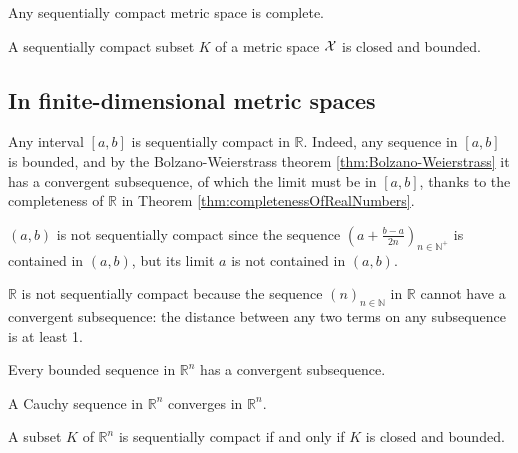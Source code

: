 \begin{coro}
  \label{coro:compactnessImpliesCompleteness}
  Any sequentially compact metric space is complete.
\end{coro}

\begin{lem}
  \label{lem:compactSetsIsClosedAndBounded}
  A sequentially compact subset $K$ of a metric space ${\cal X}$
  is closed and bounded.
\end{lem}




\subsection{In finite-dimensional metric spaces}

\begin{exm}
  Any interval $[a,b]$ is sequentially compact in $\mathbb{R}$.
  Indeed, any sequence in $[a,b]$
  is bounded, and by the Bolzano-Weierstrass theorem
  \ref{thm:Bolzano-Weierstrass}
  it has a convergent subsequence,
  of which the limit must be in $[a,b]$, 
  thanks to the completeness of $\mathbb{R}$
  in Theorem \ref{thm:completenessOfRealNumbers}.
\end{exm}

\begin{exm}
  $(a,b)$ is not sequentially compact
  since the sequence
  $\left(a+\frac{b-a}{2n}\right)_{n\in \mathbb{N}^+}$
  is contained in $(a,b)$,
  but its limit $a$ is not contained in $(a,b)$.
\end{exm}

\begin{exm}
  $\mathbb{R}$ is not sequentially compact
  because the sequence $(n)_{n\in\mathbb{N}}$ in $\mathbb{R}$
  cannot have a convergent subsequence: 
  the distance between any two terms on any subsequence is at least 1.
\end{exm}

\begin{lem}
  \label{lem:boundedSeqInRnHasConvergentSubseq}
  Every bounded sequence in $\mathbb{R}^n$
  has a convergent subsequence.
\end{lem}

\begin{lem}
  \label{lem:CauchySeqConvergesInRn}
  A Cauchy sequence in $\mathbb{R}^n$ converges in $\mathbb{R}^n$.
\end{lem}

\begin{thm}
  \label{thm:seqCompactIsBoundedAndClosedInRn}
  A subset $K$ of $\mathbb{R}^n$ is sequentially compact
  if and only if $K$ is closed and bounded.
\end{thm}

